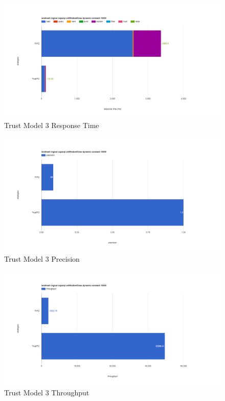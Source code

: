 \begin{figure}[!htbp]
	\centering
    \includegraphics[width=6.5in]{img/app3-trust-3-r.png}
    \caption{Trust Model 3 Response Time}
\end{figure}
\begin{figure}[!htbp]
	\centering
    \includegraphics[width=6.5in]{img/app3-trust-3-p.png}
    \caption{Trust Model 3 Precision}
\end{figure}
\begin{figure}[!htbp]
	\centering
    \includegraphics[width=6.5in]{img/app3-trust-3-t.png}
    \caption{Trust Model 3 Throughput}
\end{figure}

